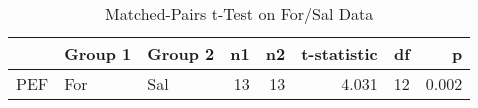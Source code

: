 \begin{table}

\caption{\label{tab:tTest}Matched-Pairs t-Test on For/Sal Data}
\centering
\begin{tabular}[t]{lllrrrrr}
\toprule
 & Group 1 & Group 2 & n1 & n2 & t-statistic & df & p\\
\midrule
PEF & For & Sal & 13 & 13 & 4.031 & 12 & 0.002\\
\bottomrule
\end{tabular}
\end{table}

